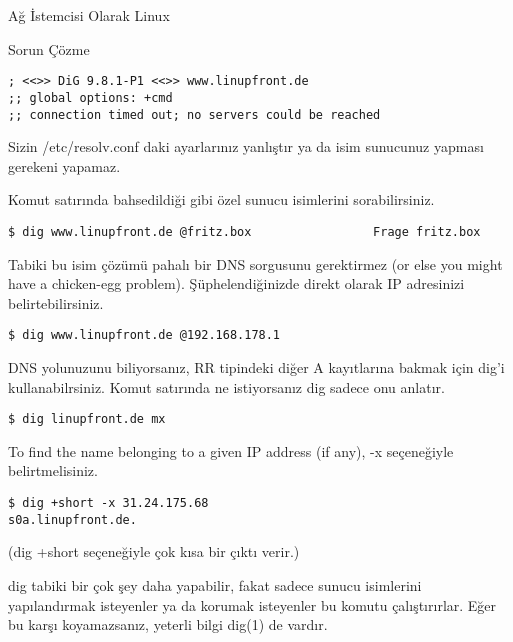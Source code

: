 \begin{section}{Ağ İstemcisi Olarak Linux}
\begin{subsection}{Sorun Çözme}
\begin{verbatim}
; <<>> DiG 9.8.1-P1 <<>> www.linupfront.de
;; global options: +cmd
;; connection timed out; no servers could be reached
\end{verbatim}
Sizin /etc/resolv.conf daki ayarlarınız yanlıştır ya da isim sunucunuz yapması gerekeni yapamaz.

Komut satırında bahsedildiği gibi özel sunucu isimlerini sorabilirsiniz.

\begin{verbatim}
$ dig www.linupfront.de @fritz.box                 Frage fritz.box
\end{verbatim}

Tabiki bu isim çözümü pahalı bir DNS sorgusunu gerektirmez (or else you might have a chicken-egg problem). Şüphelendiğinizde direkt olarak IP adresinizi belirtebilirsiniz. 

\begin{verbatim}
$ dig www.linupfront.de @192.168.178.1
\end{verbatim}

DNS yolunuzunu biliyorsanız, RR tipindeki diğer A kayıtlarına bakmak için dig'i kullanabilrsiniz. Komut satırında ne istiyorsanız dig sadece onu anlatır.

\begin{verbatim}
$ dig linupfront.de mx
\end{verbatim}

To find the name belonging to a given IP address (if any), -x seçeneğiyle belirtmelisiniz.

\begin{verbatim}
$ dig +short -x 31.24.175.68
s0a.linupfront.de.
\end{verbatim}

(dig +short seçeneğiyle çok kısa bir çıktı verir.)

dig tabiki bir çok şey daha yapabilir, fakat sadece sunucu isimlerini yapılandırmak isteyenler ya da korumak isteyenler bu komutu çalıştırırlar. Eğer bu karşı koyamazsanız, yeterli bilgi dig(1) de vardır. 


\end{subsection}
\end{section}

